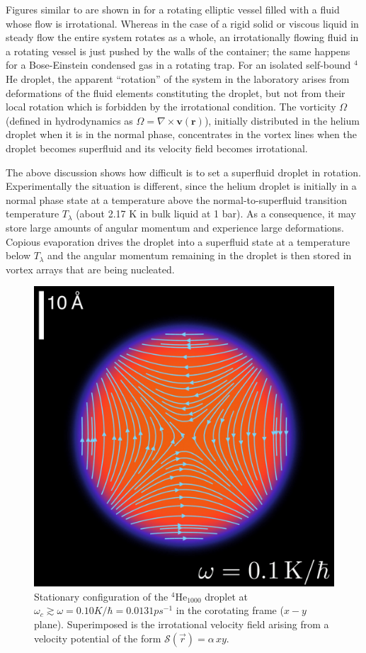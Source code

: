 Figures similar to  are shown 
in for a rotating  
elliptic vessel  filled with  a fluid whose flow is irrotational.
Whereas in the case of a rigid solid or viscous liquid in steady flow
the entire system rotates as a whole, 
an irrotationally flowing  fluid
in a rotating vessel is just pushed
 by the walls of the
container; the same happens for a Bose-Einstein condensed 
gas in a rotating trap\citep{Rec01}. For an isolated
self-bound $^4$He droplet, 
the apparent ``rotation''  of the 
system in the laboratory arises from deformations of the fluid elements constituting the droplet, but not from their local rotation which is forbidden
by the irrotational condition. The vorticity  $\Omega$ (defined in hydrodynamics as\citep{Guy15}  $\Omega= \nabla \times \mathbf{v}(\mathbf{r})$), 
initially distributed in the helium droplet when it is in the normal phase,  concentrates in the
vortex lines when the droplet becomes superfluid and its velocity field becomes irrotational. 

The above discussion shows how difficult is to set a superfluid droplet in rotation.
Experimentally\citep{Gom14,Jones2016,Ber17} 
the situation is different, since  the helium 
droplet is initially in a normal phase state at a temperature above 
the normal-to-superfluid transition temperature 
$T_{\lambda}$ (about 2.17 K in bulk liquid at 1 bar). As a 
consequence, it may store large amounts of  
angular momentum and experience large deformations. 
Copious  evaporation drives the droplet into a 
superfluid state at a temperature below $T_{\lambda}$ and 
the  angular momentum remaining in the droplet is then  stored 
 in vortex arrays that are being nucleated. 
  
\begin{figure}[h]
\centerline{\includegraphics[width=0.7\linewidth,clip]{fig8}}
\caption{\label{fig8-capture} Stationary configuration of the $^4$He$_{1000}$ droplet at $\omega_c\gtrsim\omega=0.10\unit{K/\hbar}=0.0131\unit{ps}^{-1}$ in the corotating frame ($x-y$ plane). Superimposed is the irrotational velocity field arising from a velocity potential of the form $\mathcal{S}(\vec{r})=\alpha\,xy$.}
\end{figure}

